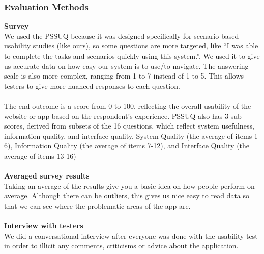 \documentclass[12pt]{article}
\begin{document}
{\subsubsection{Evaluation Methods}
\textbf{Survey} \\
We used the PSSUQ because it was designed specifically for scenario-based usability studies (like ours), so some questions are more targeted, like “I was able to complete the tasks and scenarios quickly using this system.”. We used it to give us accurate data on how easy our system is to use/to navigate. The answering scale is also more complex, ranging from 1 to 7 instead of 1 to 5. This allows testers to give more nuanced responses to each question. \\
\\
The end outcome is a score from 0 to 100, reflecting the overall usability of the website or app based on the respondent’s experience. PSSUQ also has 3 sub-scores, derived from subsets of the 16 questions, which reflect system usefulness, information quality, and interface quality. System Quality (the average of items 1-6), Information Quality (the average of items 7-12), and Interface Quality (the average of items 13-16) \\
\\
\textbf{Averaged survey results} \\ 
Taking an average of the results give you a basic idea on how people perform on average. Although there can be outliers, this gives us nice easy to read data so that we can see where the problematic areas of the app are. \\ 
\\ 
\textbf{Interview with testers} \\
We did a conversational interview after everyone was done with the usability test in order to illicit any comments, criticisms or advice about the application. \\
}
\end{document}

